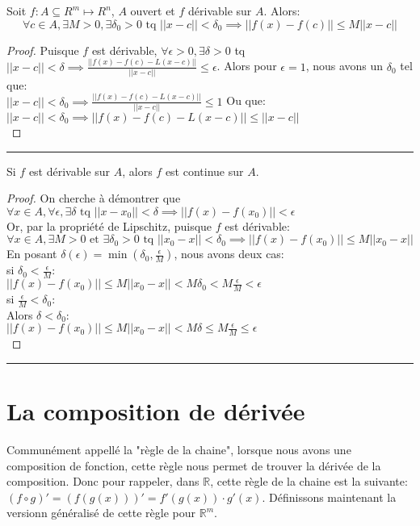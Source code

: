 \documentclass[12pt]{report}
\let\Bbb\mathbb
\theoremstyle{definition}
\newenvironment{preuve}{\renewcommand{\proofname}{Preuve}\begin{proof}}{\end{proof}\noindent\textcolor[RGB]{220,220,220}{\rule{\textwidth}{1pt}}}
\begin{document}
    \begin{prop}
        \label{thm:lipschitz}
        Soit $f: A \subseteq R^m \mapsto R^n$, $A$ ouvert et $f$ dérivable sur $A$.
        Alors: 
        $$ \forall c \in A, \exists M > 0, \exists \delta_0 > 0 \text{ tq } ||x - c|| < \delta_0 \implies ||f(x) - f(c)|| \leq M||x - c||$$
    \end{prop}
    \begin{preuve}
        Puisque $f$ est dérivable, $\forall \epsilon > 0, \exists \delta > 0$ tq 
        $||x - c|| < \delta \implies \frac{||f(x) - f(c) - L(x - c)||}{||x - c||} \leq \epsilon$.
        Alors pour $\epsilon = 1$, nous avons un $\delta_0$ tel que:\\ 
        $||x - c|| < \delta_0 \implies \frac{||f(x) - f(c) - L(x - c)||}{||x - c||} \leq 1$
        Ou que:
        $||x - c|| < \delta_0 \implies ||f(x) - f(c) - L(x - c)|| \leq ||x - c||$ \\
    \end{preuve}
    \begin{prop}[Continuité]
        \label{thm:continuite}
        Si $f$ est dérivable sur $A$, alors $f$ est continue sur $A$.
    \end{prop}
    \begin{preuve}
        On cherche à démontrer que $\forall x \in A, \forall \epsilon, \exists \delta \text{ tq } ||x - x_0|| < \delta \implies ||f(x) - f(x_0)|| < \epsilon$\\
        Or, par la propriété de Lipschitz, puisque $f$ est dérivable:
        $$ \forall x \in A, \exists M > 0\text{ et } \exists \delta_0 > 0 \text{ tq } ||x_0 - x|| < \delta_0 \implies ||f(x) - f(x_0)|| \leq M||x_0 - x||$$
        En posant $\delta(\epsilon) = \min(\delta_0, \frac{\epsilon}{M})$, nous avons 
        deux cas:\\
        si $\delta_0 < \frac{\epsilon}{M}$:\\
        $||f(x) - f(x_0)|| \leq M||x_0 - x|| < M\delta_0 < M\frac{\epsilon}{M} < \epsilon$\\
        si $\frac{\epsilon}{M} < \delta_0$:\\
        Alors $\delta < \delta_0$:\\
        $||f(x) - f(x_0)|| \leq M || x_0 - x|| < M \delta \leq M \frac{\epsilon}{M} \leq \epsilon$\\
    \end{preuve}
\pagebreak
\section{La composition de dérivée}
    Communément appellé la "règle de la chaine", lorsque nous avons une composition de fonction, cette règle
    nous permet de trouver la dérivée de la composition. Donc pour rappeler, dans $\Bbb R$, cette règle de la chaine 
    est la suivante: $(f \circ g)' = (f(g(x)))' = f'(g(x)) \cdot g'(x)$. Définissons maintenant la versionn
    généralisé de cette règle pour $\Bbb R^m$.
\end{document}
